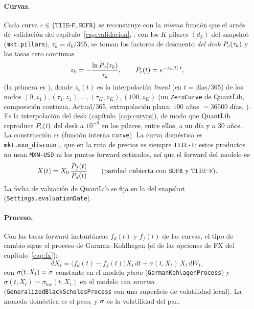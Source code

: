 \paragraph{Curvas.} Cada curva $c\in\{\texttt{TIIE-F},\texttt{SOFR}\}$ se reconstruye con la \emph{misma} función que el
arnés de validación del capítulo~\ref{cap:validacion}, : con los $K$ pilares $(d_k)$ del
snapshot (\texttt{mkt.pillars}), $\tau_k=d_k/365$, se toman los factores de descuento \emph{del desk} $P_{c}(\tau_k)$ y las
tasas cero continuas
\begin{equation}\label{eq:cap15-cero}
  z_k=-\frac{\ln P_{c}(\tau_k)}{\tau_k},\qquad
  P_{c}(t)=e^{-z_c(t)\,t},
\end{equation}
(la primera es ),
donde $z_c(t)$ es la interpolación \emph{lineal} (en $t=\text{días}/365$) de los nodos $(0,z_1),(\tau_1,z_1),\dots,(\tau_K,z_K),(100,z_K)$
(un \texttt{ZeroCurve} de QuantLib, composición continua, Actual/365, extrapolación plana; $100$ años $=36500$ días,
). Es la interpolación del desk (capítulo~\ref{cap:curvas}), de modo que QuantLib
reproduce $P_{c}(t)$ del desk a $10^{-9}$ en los pilares, entre ellos, a un día y a 30 años. La construcción es
 (función interna \texttt{curve}). La curva doméstica es \texttt{mkt.mxn\_discount},
que en la ruta de precios es siempre \texttt{TIIE-F}: estos productos no usan \texttt{MXN-USD} ni los puntos forward
cotizados, así que el forward del modelo es
\begin{equation}\label{eq:cap15-forward}
  X(t)=X_0\,\frac{P_{f}(t)}{P_{d}(t)}\qquad(\text{paridad cubierta con \texttt{SOFR} y \texttt{TIIE-F}}).
\end{equation}
La fecha de valuación de QuantLib se fija en la del snapshot (\texttt{Settings.evaluationDate}).

\paragraph{Proceso.} Con las tasas forward instantáneas $f_d(t)$ y $f_f(t)$ de las curvas, el tipo de cambio sigue el
proceso de Garman--Kohlhagen \citep{garman1983} (el de las opciones de FX del capítulo~\ref{cap:fx}):
\begin{equation}\label{eq:cap15-proceso}
  dX_t=\bigl(f_d(t)-f_f(t)\bigr)X_t\,dt+\sigma(t,X_t)\,X_t\,dW_t,
\end{equation}
con $\sigma(t,X_t)=\sigma$ constante en el modelo \emph{plano} (\texttt{GarmanKohlagenProcess}) y $\sigma(t,X_t)=\sigma_{\mathrm{loc}}(t,X_t)$
en el modelo \emph{con sonrisa} (\texttt{GeneralizedBlackScholesProcess} con una superficie de volatilidad local). La moneda doméstica
es el peso, y $\sigma$ es la volatilidad del par.

